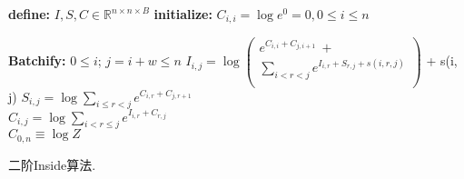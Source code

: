 \begin{algorithm}[tb]
  \begin{algorithmic}[1]
    \newlength{\commentindent}
    \setlength{\commentindent}{.3\textwidth}
    \renewcommand{\algorithmiccomment}[1]{\unskip\hfill\makebox[\commentindent][l]{$\rhd$~#1}\par}
    \LetLtxMacro{\oldalgorithmic}{\algorithmic}
    \renewcommand{\algorithmic}[1][0]{
      \oldalgorithmic[#1]
      \renewcommand{\ALC@com}[1]{
        \ifnum\pdfstrcmp{##1}{default}=0\else\algorithmiccomment{##1}\fi}%
    }
    \STATE \textbf{define:} $I,S,C \in \mathbb{R}^{n \times n \times B}$ 
    \STATE \textbf{initialize:} $C_{i, i} = \log e^0 = 0, 0 \le i \le n$

    \STATE \textbf{Batchify:} $0 \le i$; $j=i+w \le n$
    \STATE
    $I_{i, j} = \log\left(
      \begin{array}{l}
          e^{C_{i, i}  +  C_{j, i+1}} ~ + \\
          \sum\limits_{i < r < j} e^{I_{i, r} + S_{r, j}
              + s(i, r, j)}               \\
        \end{array}
      \right)$ + s(i, j)
    \STATE $S_{i, j} = \log \sum\limits_{i \le r < j} e^{C_{i, r}  +  C_{j, r+1}} $ \\
    \STATE $C_{i, j} = \log
      \sum\limits_{i < r \le j} e^{I_{i, r}  +  C_{r, j}}  $ \\
    \ENDFOR {}
    \RETURN $C_{0, n} \equiv \log Z$
  \end{algorithmic}
  \caption{二阶Inside算法.}
  \label{alg:eisner-2o}
\end{algorithm}
